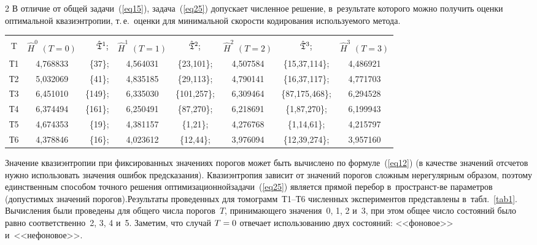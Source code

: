 \begin{multicols}{2}
В отличие от общей задачи~(\ref{eq15}), задача~(\ref{eq25}) 
допускает численное решение, в~результате которого можно получить 
оценки оптимальной квазиэнтропии, т.\,е.\ оценки для минимальной скорости 
кодирования используемого метода.

\begin{table*}\small
\begin{center}
\label{tab1}
\vspace{2ex}
\begin{tabular}{|c|c|rc|cc|cc|}
\hline
&&&&&&&\\[-9pt]
 T & $\hat{H}^0$ $(T=0)$ & $\hat{\frak T}^1;$ & $\hat{H}^1$ $(T=1)$ &
$\hat{\frak T}^2;$ & $\hat{H}^2$ $(T=2)$ & $\hat{\frak T}^3;$ & 
$\hat{H}^3$ $(T=3)$\\
\hline
Т1 & 4,768833 & \{37\}; & 4,564031 & \{23,101\}; & 4,507584 & \{15,37,114\}; & 
4,486921 \\
Т2 & 5,032069 & \{41\}; & 4,835185 & \{29,113\}; & 4,790141 & \{16,37,117\}; & 4,771703\\
Т3 & 6,451010 & \{149\}; & 6,335030 & \{101,257\}; & 6,309464 & \{87,175,468\}; & 6,294528 \\
Т4 & 6,374494 & \{161\}; & 6,250491 & \{87,270\}; & 6,218691 & \{1,87,270\}; & 6,199943 \\
Т5 & 4,674353 & \{19\}; & 4,381157 & \{1,21\}; & 4,276768 & \{1,14,61\}; & 4,215797 \\
Т6 & 4,378846 & \{16\}; & 4,023612 & \{12,44\}; & 3,976094 & \{12,39,274\}; & 3,957160 \\
\hline
\end{tabular}
\end{center}
\end{table*}


Значение квазиэнтропии при фиксированных значениях порогов может быть 
вычислено по формуле~(\ref{eq12}) (в качестве значений отсчетов нужно 
использовать значения ошибок предсказания). Квази\-энтропия зависит от значений 
порогов сложным нерегулярным образом, поэтому единственным способом точного 
решения оптимизационной\linebreak задачи~(\ref{eq25}) является прямой перебор 
в~пространст-\linebreak ве 
параметров (допустимых значений порогов).\linebreak Результаты проведенных для томограмм~Т1--Т6 
чис\-лен\-ных экспериментов представлены в~табл.~\ref{tab1}. 
Вычисления были проведены для общего числа порогов~$T$, принимающего значения~0, 1, 
2 и~3, при этом общее число состояний было равно соответственно~2, 3, 4 и~5. 
Заметим, что случай $T\hm=0$ отвечает использованию двух состояний: <<фоновое>> 
и~<<нефоновое>>.



\end{multicols}

